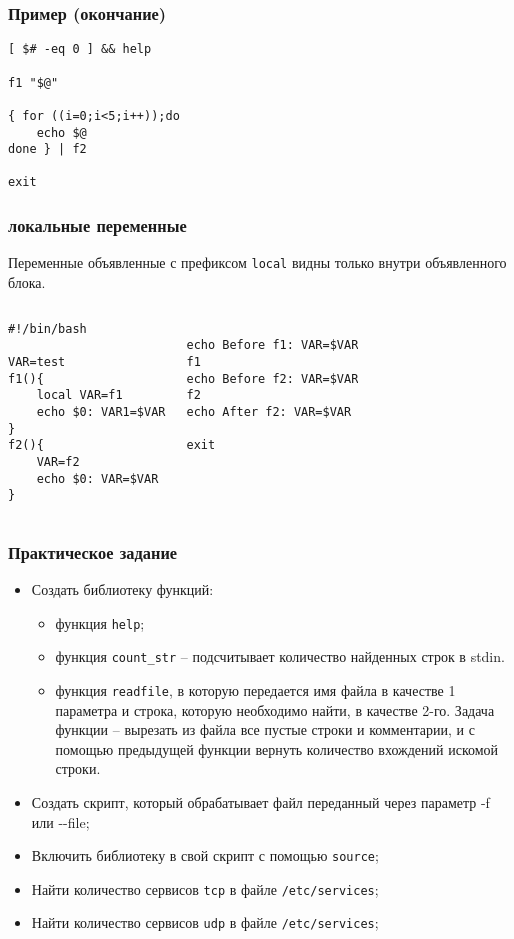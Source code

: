\begin{frame}[fragile]
	\frametitle{Пример (окончание)}
	\small
	\begin{lstlisting}
[ $# -eq 0 ] && help

f1 "$@"

{ for ((i=0;i<5;i++));do
	echo $@
done } | f2

exit
	\end{lstlisting}

\end{frame}

\begin{frame}[fragile]
	\frametitle{локальные переменные}

	Переменные объявленные с префиксом {\tt local} видны только внутри объявленного блока.

	\small
	\begin{columns}
		\begin{lstlisting}
#!/bin/bash

VAR=test
f1(){
	local VAR=f1
	echo $0: VAR1=$VAR
}
f2(){
    VAR=f2
    echo $0: VAR=$VAR
}
		\end{lstlisting}
		\begin{lstlisting}

echo Before f1: VAR=$VAR
f1
echo Before f2: VAR=$VAR
f2
echo After f2: VAR=$VAR

exit
		\end{lstlisting}
	\end{columns}

\end{frame}

\begin{frame}
	\frametitle{Практическое задание}
	\begin{itemize}
		\item Создать библиотеку функций:
			\begin{itemize}
				\item функция {\tt help};
				\item функция {\tt count\_str} -- подсчитывает количество найденных строк в stdin.
				\item функция {\tt readfile}, в которую передается имя файла в качестве 1 параметра
					и строка, которую необходимо найти, в качестве 2-го.
					Задача функции -- вырезать из файла все пустые строки и комментарии, 
					и с помощью предыдущей функции вернуть количество вхождений искомой строки.
			\end{itemize}
		\item Создать скрипт, который обрабатывает файл переданный через параметр -f или -{}-file;
		\item Включить библиотеку в свой скрипт с помощью {\tt source};
		\item Найти количество сервисов {\tt tcp} в файле {\tt /etc/services};
		\item Найти количество сервисов {\tt udp} в файле {\tt /etc/services};
  \end{itemize}
\end{frame}

